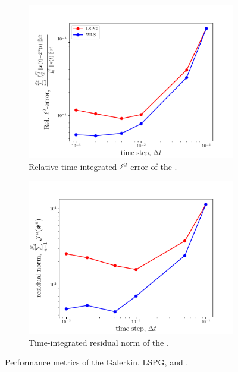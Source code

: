 \begin{figure}
\begin{center}
\begin{subfigure}[t]{0.45\textwidth}
\includegraphics[width=1.\linewidth]{figs/sod/error_vs_window_dtvar.pdf}
\caption{Relative time-integrated $\ell^2$-error of the \methodAcronymROM.}
\label{fig:sod_error_methods_a}
\end{subfigure}
\begin{subfigure}[t]{0.45\textwidth}
\includegraphics[width=1.\linewidth]{figs/sod/objective_vs_window_dtvar.pdf}
\caption{Time-integrated residual norm of the \methodAcronymROM.} 
\label{fig:sod_error_methods_b}
\end{subfigure}
\caption{Performance metrics of the Galerkin, LSPG, and \methodAcronymROMs.} 
\label{fig:time_step_study}
\end{center}
\end{figure}

